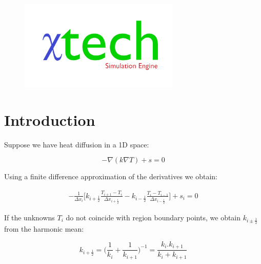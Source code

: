 \documentclass[11pt,letterpaper,titlepage]{article}
\newcommand{\half}{\frac{1}{2}}
\begin{document}
\begin{titlepage}
\begin{center}
\begin{minipage}[c]{0.45\textwidth}
\begin{figure}[H]
				\includegraphics[width=3in]{Logo2_Medium.png}
			\end{figure}
		\end{minipage}
	\end{center}
	\vspace{2cm}
\end{titlepage}


\pagestyle{fancy}
\cfoot{}
\lfoot{\truncate{14cm}{\NSCDOCTITLE}}
\rhead{}
\chead{\currentname}
\lhead{}
\renewcommand{\footrulewidth}{0.4pt}
\tableofcontents
{}

\listoffigures
{}


\newpage
{}
\section{Introduction}
Suppose we have heat diffusion in a 1D space:

\begin{equation}
-\nabla (k\nabla T) + s = 0
\end{equation}

Using a finite difference approximation of the derivatives we obtain:

\begin{equation*}
\begin{aligned}
-\frac{1}{\Delta x_i} 
\biggr [
k_{i+\half} \frac{T_{i+1}-T_{i}}{\Delta x_{i+\half}} -
k_{i-\half} \frac{T_{i}-T_{i-1}}{\Delta x_{i-\half}} 
\biggr] + s_i = 0
\end{aligned}
\end{equation*}

If the unknowns $T_i$ do not coincide with region boundary points, we obtain $k_{i\pm \half}$ from the harmonic mean:

$$
k_{i+\half} = \biggr( \frac{1}{k_i} + \frac{1}{k_{i+1}}     \biggr)^{-1} = 
\frac{k_i.k_{i+1}}{k_i+k_{i+1}}
$$
\end{document}
